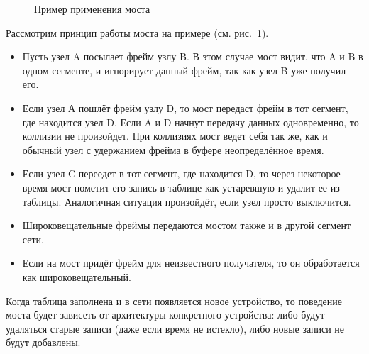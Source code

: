 \begin{figure}[h!]
	\caption{Пример применения моста}
	\label{fig:bridge}
\end{figure}
Рассмотрим принцип работы моста на примере (см. рис.~\ref{fig:bridge}). 
\begin{itemize}
	\item Пусть узел A посылает фрейм узлу B. В этом случае мост видит, что A и B в одном сегменте, и игнорирует данный фрейм, так как узел B уже получил его. 
	\item Если узел А пошлёт фрейм узлу D, то мост передаст фрейм в тот сегмент, где находится узел D. Если A и D начнут передачу данных одновременно, то коллизии не произойдет. При коллизиях мост ведет себя так же, как и обычный узел с удержанием фрейма в буфере неопределённое время.
	\item Если узел C переедет в тот сегмент, где находится D, то через некоторое время мост пометит его запись в таблице как устаревшую и удалит ее из таблицы. Аналогичная ситуация произойдёт, если узел просто выключится.
	\item Широковещательные фреймы передаются мостом также и в другой сегмент сети.
	\item Если на мост придёт фрейм для неизвестного получателя, то он обработается как широковещательный.
\end{itemize}

Когда таблица заполнена и в сети появляется новое устройство, то поведение моста будет зависеть от архитектуры конкретного устройства: либо будут удаляться старые записи (даже если время не истекло), либо новые записи не будут добавлены.
